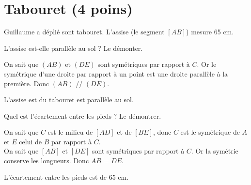 \section{Tabouret (4 poins)}

\begin{multicols}{2}
	Guillaume a déplié sont tabouret. L'assise (le segment $[AB]$) mesure 65 cm.

\begin{questions}
	
	\question[2] L'assise est-elle parallèle au sol ? Le démonter.
	
	\begin{solution}
		On sait que $(AB)$ et $(DE)$ sont symétriques par rapport à $C$.
		Or le symétrique d'une droite par rapport à un point est une droite parallèle à la première.
		Donc $(AB)$ // $(DE)$.
		
		L'assise est du tabouret est parallèle au sol.
	\end{solution}

	\question[2] Quel est l'écartement entre les pieds ? Le démontrer.
	\begin{solution}
		On sait que $C$ est le milieu de $[AD]$ et de $[BE]$, donc $C$ est le symétrique de $A$ et $E$ celui de $B$ par rapport à $C$.\\
		
		On sait que $[AB]$ et $[DE]$ sont symétriques par rapport à $C$.
		Or la symétrie conserve les longueurs.
		Donc $AB$ = $DE$.
		
		L'écartement entre les pieds est de 65 cm.
		
	\end{solution}
	
	
\end{questions}


\end{multicols}
